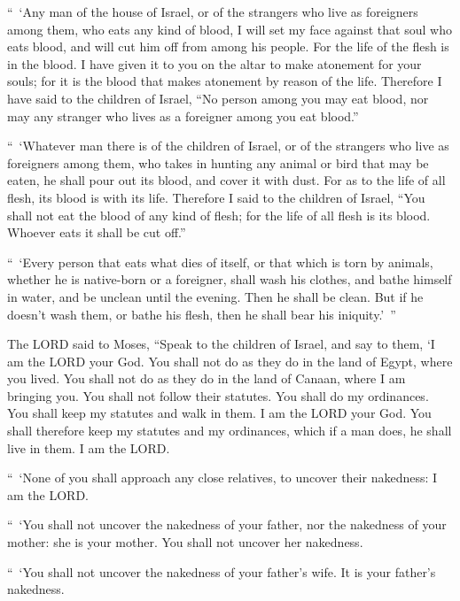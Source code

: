 \myverse{}“ ‘Any man of the house of Israel, or of the strangers who live
as foreigners among them, who eats any kind of blood, I will set my face against that soul who eats blood,
and will cut him off from among his people.
\myverse{}For the life of the flesh is in the blood. I have given it to you on the
altar to make atonement for your souls; for it is the blood that makes atonement by reason of the life.
\myverse{}Therefore I have said to the children of Israel, “No person among you may
eat blood, nor may any stranger who lives as a foreigner among you eat blood.”


\myverse{}“ ‘Whatever man there is of the children of Israel, or of the
strangers who live as foreigners among them, who takes in hunting any animal or bird that may be eaten,
he shall pour out its blood, and cover it with dust.
\myverse{}For as to the life of all flesh, its blood is with its life. Therefore I
said to the children of Israel, “You shall not eat the blood of any kind of flesh; for the life of all
flesh is its blood. Whoever eats it shall be cut off.”


\myverse{}“ ‘Every person that eats what dies of itself, or that which
is torn by animals, whether he is native-born or a foreigner, shall wash his clothes, and bathe himself
in water, and be unclean until the evening. Then he shall be clean.
\myverse{}But if he doesn’t wash them, or bathe his flesh, then he shall bear his iniquity.’ ”


\mychapter{} \myverse*{}The LORD said to Moses,
\myverse{}“Speak to the children of Israel, and say to them, ‘I am the LORD your God.
\myverse{}You shall not do as they do in the land of Egypt, where you lived. You shall
not do as they do in the land of Canaan, where I am bringing you. You shall not follow their statutes.
\myverse{}You shall do my ordinances. You shall keep my statutes and walk in them. I
am the LORD your God.
\myverse{}You shall therefore keep my statutes and my ordinances, which if a man does,
he shall live in them. I am the LORD.


\myverse{}“ ‘None of you shall approach any close relatives, to uncover their
nakedness: I am the LORD.


\myverse{}“ ‘You shall not uncover the nakedness of your father, nor the
nakedness of your mother: she is your mother. You shall not uncover her nakedness.


\myverse{}“ ‘You shall not uncover the nakedness of your father’s wife. It
is your father’s nakedness.


